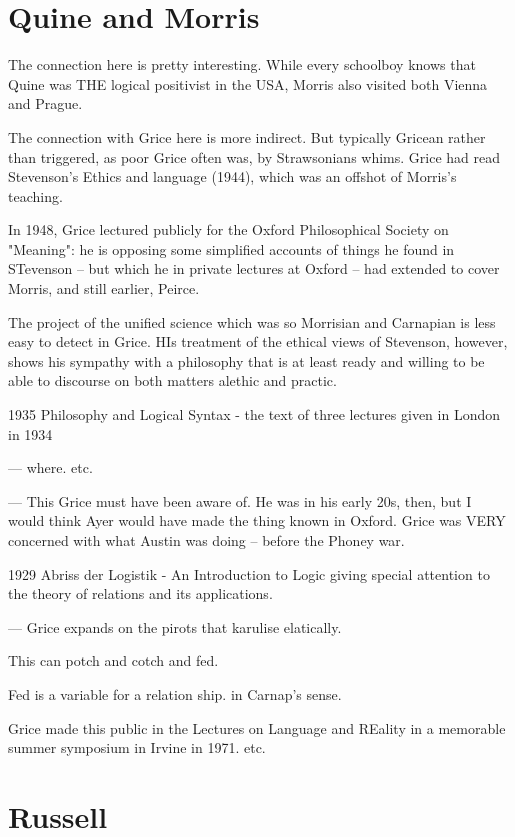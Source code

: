 \documentclass[10pt,titlepage]{book}
\begin{document}
{\section{Quine and Morris}
 
The connection here is pretty interesting.
While every schoolboy knows that Quine was THE logical positivist in the USA, Morris also visited both Vienna and Prague.
 
The connection with Grice here is more indirect.
But typically Gricean rather than triggered, as poor Grice often was, by Strawsonians whims.
Grice had read Stevenson's Ethics and language (1944), which was an offshot of Morris's teaching.

In 1948, Grice lectured publicly for the Oxford Philosophical Society  on "Meaning": he is opposing some simplified accounts of things 
he found in  STevenson -- but which he in private lectures at Oxford --  had 
extended to  cover Morris, and still earlier, Peirce.
 
The project of the unified science which was so Morrisian and  
Carnapian is less easy to detect in Grice. HIs treatment of the ethical views of Stevenson, however, shows his sympathy with a philosophy that is at least ready  and willing to be able to discourse on both matters alethic and practic.

1935 Philosophy and Logical Syntax - the text of  three lectures given in 
London in 1934  

--- where. etc.
 
---
This Grice must have been aware of. He was in his early 20s, then, but I  
would think Ayer would have made the thing known in Oxford. Grice was VERY  
concerned with what Austin was doing -- before the Phoney war.

1929 Abriss der Logistik - An Introduction to Logic giving special  
attention to the theory of relations and its applications.
 
 
--- Grice expands on the pirots that karulise elatically.
 
This can potch and cotch and fed.
 
Fed is a variable for a relation ship. in Carnap's sense.
 
Grice made this public in the Lectures on Language and REality in a  memorable summer symposium in Irvine in 1971. etc.
 
\section{Russell}
 
}
\end{document}
